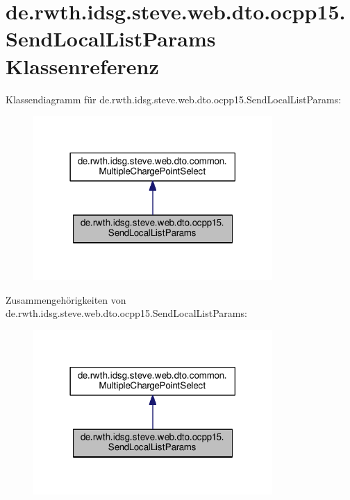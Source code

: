 \hypertarget{classde_1_1rwth_1_1idsg_1_1steve_1_1web_1_1dto_1_1ocpp15_1_1_send_local_list_params}{\section{de.\+rwth.\+idsg.\+steve.\+web.\+dto.\+ocpp15.\+Send\+Local\+List\+Params Klassenreferenz}
\label{classde_1_1rwth_1_1idsg_1_1steve_1_1web_1_1dto_1_1ocpp15_1_1_send_local_list_params}
}


Klassendiagramm für de.\+rwth.\+idsg.\+steve.\+web.\+dto.\+ocpp15.\+Send\+Local\+List\+Params\+:\nopagebreak
\begin{figure}[H]
\begin{center}
\leavevmode
\includegraphics[width=258pt]{classde_1_1rwth_1_1idsg_1_1steve_1_1web_1_1dto_1_1ocpp15_1_1_send_local_list_params__inherit__graph}
\end{center}
\end{figure}


Zusammengehörigkeiten von de.\+rwth.\+idsg.\+steve.\+web.\+dto.\+ocpp15.\+Send\+Local\+List\+Params\+:\nopagebreak
\begin{figure}[H]
\begin{center}
\leavevmode
\includegraphics[width=258pt]{classde_1_1rwth_1_1idsg_1_1steve_1_1web_1_1dto_1_1ocpp15_1_1_send_local_list_params__coll__graph}
\end{center}
\end{figure}


